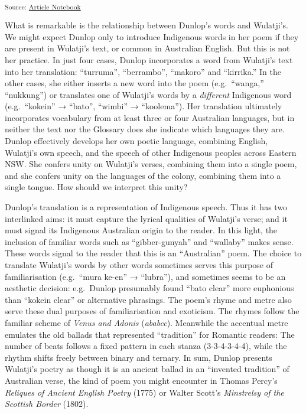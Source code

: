 \documentclass[
  Crown,
  times,
  sageh]{sagej}
\begin{document}
\textsubscript{Source:
\href{https://michaelgfalk.github.io/harpur-dunlop-wulatji/harpur-dunlop-wulatji.qmd.html}{Article
Notebook}}

What is remarkable is the relationship between Dunlop's words and
Wulatji's. We might expect Dunlop only to introduce Indigenous words in
her poem if they are present in Wulatji's text, or common in Australian
English. But this is not her practice. In just four cases, Dunlop
incorporates a word from Wulatji's text into her translation:
``turruma'', ``berrambo'', ``makoro'' and ``kirrika.'' In the other
cases, she either inserts a new word into the poem (e.g.~``wanga,''
``nukkung'') or translates one of Wulatji's words by a \emph{different}
Indigenous word (e.g.~``kokein'' → ``bato'', ``wimbi'' → ``koolema'').
Her translation ultimately incorporates vocabulary from at least three
or four Australian languages, but in neither the text nor the Glossary
does she indicate which languages they are. Dunlop effectively develops
her own poetic language, combining English, Wulatji's own speech, and
the speech of other Indigenous peoples across Eastern NSW. She confers
unity on Wulatji's verses, combining them into a single poem, and she
confers unity on the languages of the colony, combining them into a
single tongue. How should we interpret this unity?

Dunlop's translation is a representation of Indigenous speech. Thus it
has two interlinked aims: it must capture the lyrical qualities of
Wulatji's verse; and it must signal its Indigenous Australian origin to
the reader. In this light, the inclusion of familiar words such as
``gibber-gunyah'' and ``wallaby'' makes sense. These words signal to the
reader that this is an ``Australian'' poem. The choice to translate
Wulatji's words by other words sometimes serves this purpose of
familiarisation (e.g.~``mura ke-en'' → ``lubra''), and sometimes seems
to be an aesthetic decision: e.g.~Dunlop presumably found ``bato clear''
more euphonious than ``kokein clear'' or alternative phrasings. The
poem's rhyme and metre also serve these dual purposes of familiarisation
and exoticism. The rhymes follow the familiar scheme of \emph{Venus and
Adonis} (\emph{ababcc}). Meanwhile the accentual metre emulates the old
ballads that represented ``tradition'' for Romantic readers: The number
of beats follows a fixed pattern in each stanza (3-3-4-3-4-4), while the
rhythm shifts freely between binary and ternary. In sum, Dunlop presents
Wulatji's poetry as though it is an ancient ballad in an ``invented
tradition'' of Australian verse, the kind of poem you might encounter in
Thomas Percy's \emph{Reliques of Ancient English Poetry} (1775) or
Walter Scott's \emph{Minstrelsy of the Scottish Border} (1802).
\end{document}
